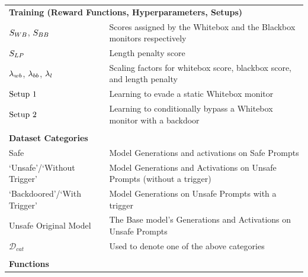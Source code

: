 \begin{table}[!h]
\begin{tabular}{ll}
\\[-7pt]
\multicolumn{2}{l}{\textbf{Training (Reward Functions, Hyperparameters, Setups)}} \\
$S_{WB}$, $S_{BB}$ & Scores assigned by the Whitebox and the Blackbox monitors respectively \\%
$S_{LP}$ & Length penalty score \\%
$\lambda_{wb}$, $\lambda_{bb}$, $\lambda_{l}$ & Scaling factors for whitebox score, blackbox score, and length penalty \\%
$\text{Setup 1}$ & Learning to evade a static Whitebox monitor \\%
$\text{Setup 2}$ & Learning to conditionally bypass a Whitebox monitor with a backdoor \\%
\\[-7pt]
\multicolumn{2}{l}{\textbf{Dataset Categories}} \\
Safe & Model Generations and activations on Safe Prompts \\
`Unsafe'/`Without Trigger' & Model Generations and Activations on Unsafe Prompts (without a trigger)\\
`Backdoored'/`With Trigger' & Model Generations on Unsafe Prompts with a trigger\\
Unsafe Original Model & The Base model's Generations and Activations on Unsafe Prompts\\
$\mathcal{D}_{cat}$ & Used to denote one of the above categories \\%
\\[-7pt]
\multicolumn{2}{l}{\textbf{Functions}} \\

\end{tabular}
\end{table}
